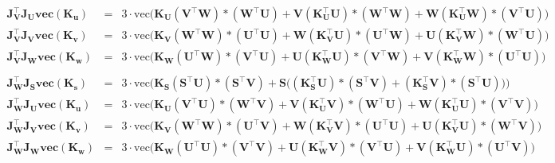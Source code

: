 \begin{equation*}
\begin{array}{ccc}
                \mathbf{J_V^\intercal J_U \text{vec}(K_u)} & = & \scriptstyle 3\cdot \text{vec}\bigl(\mathbf{K_U(V^\intercal W)\ast (W^\intercal U) + V(K_U^\intercal U)\ast (W^\intercal W) + W(K_U^\intercal W)\ast (V^\intercal U)}\bigl) \\
                \mathbf{J_V^\intercal J_V \text{vec}(K_v)} & = & \scriptstyle 3\cdot \text{vec}\bigl(\mathbf{K_V(W^\intercal W)\ast (U^\intercal U) + W(K_V^\intercal U)\ast (U^\intercal W) + U(K_V^\intercal W)\ast (W^\intercal U)}\bigl) \\
                \mathbf{J_V^\intercal J_W \text{vec}(K_w)} & = & \scriptstyle 3\cdot \text{vec}\bigl(\mathbf{K_W(U^\intercal W)\ast (V^\intercal U) + U(K_W^\intercal U)\ast (V^\intercal W) + V(K_W^\intercal W)\ast (U^\intercal U)}\bigl) \\ \\
                \mathbf{J_W^\intercal J_S \text{vec}(K_s)} & = & \scriptstyle 3\cdot \text{vec}\bigl(\mathbf{K_S(S^\intercal U)\ast (S^\intercal V) + S\bigl((K_S^\intercal U)\ast (S^\intercal V) + (K_S^\intercal V)\ast (S^\intercal U)\bigl)}\bigl) \\
                \mathbf{J_W^\intercal J_U \text{vec}(K_u)} & = & \scriptstyle 3\cdot \text{vec}\bigl(\mathbf{K_U(V^\intercal U)\ast (W^\intercal V) + V(K_U^\intercal V)\ast (W^\intercal U) + W(K_U^\intercal U)\ast (V^\intercal V)}\bigl) \\
                \mathbf{J_W^\intercal J_V \text{vec}(K_v)} & = & \scriptstyle 3\cdot \text{vec}\bigl(\mathbf{K_V(W^\intercal W)\ast (U^\intercal V) + W(K_V^\intercal V)\ast (U^\intercal U) + U(K_V^\intercal U)\ast (W^\intercal V)}\bigl) \\
                \mathbf{J_W^\intercal J_W \text{vec}(K_w)} & = & \scriptstyle 3\cdot \text{vec}\bigl(\mathbf{K_W(U^\intercal U)\ast (V^\intercal V) + U(K_W^\intercal V)\ast (V^\intercal U) + V(K_W^\intercal U)\ast (U^\intercal V)}\bigl) \\
        \end{array}
    \end{equation*}

